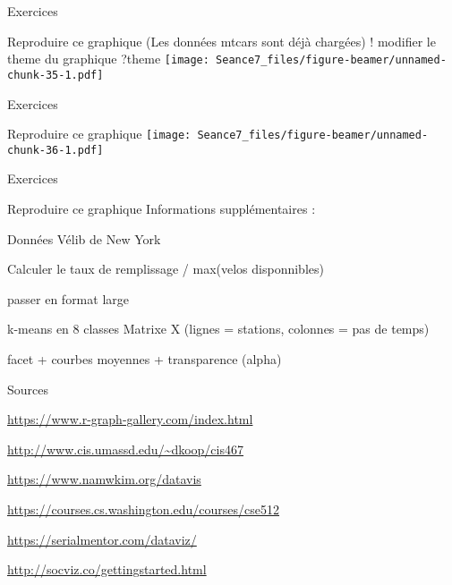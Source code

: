 \documentclass[ignorenonframetext,]{beamer}
\begin{document}
\begin{frame}{Exercices}
\protect\hypertarget{exercices-3}{}

Reproduire ce graphique (Les données mtcars sont déjà chargées) !
modifier le theme du graphique ?theme
\texttt{[image: Seance7\_files/figure-beamer/unnamed-chunk-35-1.pdf]}

\end{frame}

\begin{frame}{Exercices}
\protect\hypertarget{exercices-4}{}

Reproduire ce graphique
\texttt{[image: Seance7\_files/figure-beamer/unnamed-chunk-36-1.pdf]}

\end{frame}

\begin{frame}{Exercices}
\protect\hypertarget{exercices-5}{}

Reproduire ce graphique Informations supplémentaires :

Données Vélib de New York

Calculer le taux de remplissage / max(velos disponnibles)

passer en format large

k-means en 8 classes Matrixe X (lignes = stations, colonnes = pas de
temps)

facet + courbes moyennes + transparence (alpha)

\end{frame}

\begin{frame}{Sources}
\protect\hypertarget{sources}{}

\url{https://www.r-graph-gallery.com/index.html}

\url{http://www.cis.umassd.edu/~dkoop/cis467}

\url{https://www.namwkim.org/datavis}

\url{https://courses.cs.washington.edu/courses/cse512}

\url{https://serialmentor.com/dataviz/}

\url{http://socviz.co/gettingstarted.html}

\end{frame}
\end{document}
